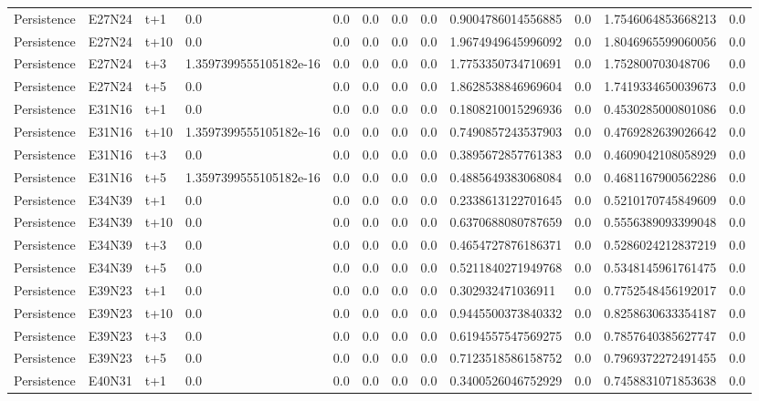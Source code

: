 \begin{landscape}
\begin{longtable}{llllllllllll}
Persistence & E27N24 & t+1 & 0.0 & 0.0 & 0.0 & 0.0 & 0.0 & 0.9004786014556885 & 0.0 & 1.7546064853668213 & 0.0 \\
Persistence & E27N24 & t+10 & 0.0 & 0.0 & 0.0 & 0.0 & 0.0 & 1.9674949645996092 & 0.0 & 1.8046965599060056 & 0.0 \\
Persistence & E27N24 & t+3 & 1.3597399555105182e-16 & 0.0 & 0.0 & 0.0 & 0.0 & 1.7753350734710691 & 0.0 & 1.752800703048706 & 0.0 \\
Persistence & E27N24 & t+5 & 0.0 & 0.0 & 0.0 & 0.0 & 0.0 & 1.8628538846969604 & 0.0 & 1.7419334650039673 & 0.0 \\
Persistence & E31N16 & t+1 & 0.0 & 0.0 & 0.0 & 0.0 & 0.0 & 0.1808210015296936 & 0.0 & 0.4530285000801086 & 0.0 \\
Persistence & E31N16 & t+10 & 1.3597399555105182e-16 & 0.0 & 0.0 & 0.0 & 0.0 & 0.7490857243537903 & 0.0 & 0.4769282639026642 & 0.0 \\
Persistence & E31N16 & t+3 & 0.0 & 0.0 & 0.0 & 0.0 & 0.0 & 0.3895672857761383 & 0.0 & 0.4609042108058929 & 0.0 \\
Persistence & E31N16 & t+5 & 1.3597399555105182e-16 & 0.0 & 0.0 & 0.0 & 0.0 & 0.4885649383068084 & 0.0 & 0.4681167900562286 & 0.0 \\
Persistence & E34N39 & t+1 & 0.0 & 0.0 & 0.0 & 0.0 & 0.0 & 0.2338613122701645 & 0.0 & 0.5210170745849609 & 0.0 \\
Persistence & E34N39 & t+10 & 0.0 & 0.0 & 0.0 & 0.0 & 0.0 & 0.6370688080787659 & 0.0 & 0.5556389093399048 & 0.0 \\
Persistence & E34N39 & t+3 & 0.0 & 0.0 & 0.0 & 0.0 & 0.0 & 0.4654727876186371 & 0.0 & 0.5286024212837219 & 0.0 \\
Persistence & E34N39 & t+5 & 0.0 & 0.0 & 0.0 & 0.0 & 0.0 & 0.5211840271949768 & 0.0 & 0.5348145961761475 & 0.0 \\
Persistence & E39N23 & t+1 & 0.0 & 0.0 & 0.0 & 0.0 & 0.0 & 0.302932471036911 & 0.0 & 0.7752548456192017 & 0.0 \\
Persistence & E39N23 & t+10 & 0.0 & 0.0 & 0.0 & 0.0 & 0.0 & 0.9445500373840332 & 0.0 & 0.8258630633354187 & 0.0 \\
Persistence & E39N23 & t+3 & 0.0 & 0.0 & 0.0 & 0.0 & 0.0 & 0.6194557547569275 & 0.0 & 0.7857640385627747 & 0.0 \\
Persistence & E39N23 & t+5 & 0.0 & 0.0 & 0.0 & 0.0 & 0.0 & 0.7123518586158752 & 0.0 & 0.7969372272491455 & 0.0 \\
Persistence & E40N31 & t+1 & 0.0 & 0.0 & 0.0 & 0.0 & 0.0 & 0.3400526046752929 & 0.0 & 0.7458831071853638 & 0.0 \\

\end{longtable}
\end{landscape}
